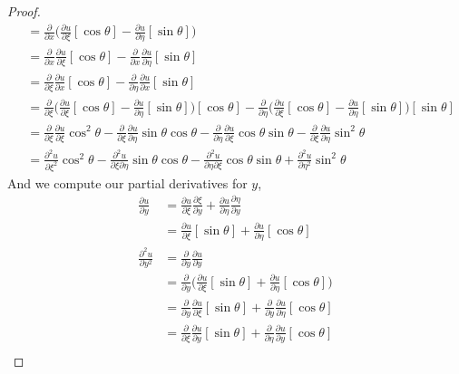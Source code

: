 \documentclass[12pt]{article}
\begin{document}
\begin{enumerate}
\begin{enumerate}
\begin{proof}
\begin{align*}
&= \frac{\partial}{\partial x}\Bigg(\frac{\partial u}{\partial \xi}[\cos\theta]- \frac{\partial u}{\partial \eta}[\sin \theta]\Bigg) \\
&= \frac{\partial}{\partial x}\frac{\partial u}{\partial \xi}[\cos\theta]-\frac{\partial}{\partial x} \frac{\partial u}{\partial \eta}[\sin \theta] \\
&= \frac{\partial}{\partial \xi}\frac{\partial u}{\partial x}[\cos\theta]-\frac{\partial}{\partial \eta} \frac{\partial u}{\partial x}[\sin \theta] \\
&= \frac{\partial}{\partial \xi}\Bigg(\frac{\partial u}{\partial \xi}[\cos\theta]- \frac{\partial u}{\partial \eta}[\sin \theta]\Bigg)[\cos\theta]-\frac{\partial}{\partial \eta} \Bigg(\frac{\partial u}{\partial \xi}[\cos\theta]- \frac{\partial u}{\partial \eta}[\sin \theta]\Bigg)[\sin \theta] \\
&= \frac{\partial}{\partial \xi}\frac{\partial u}{\partial \xi}\cos^2\theta-\frac{\partial}{\partial \xi} \frac{\partial u}{\partial \eta}\sin \theta\cos\theta-\frac{\partial}{\partial \eta}\frac{\partial u}{\partial \xi}\cos\theta\sin \theta- \frac{\partial}{\partial \xi}\frac{\partial u}{\partial \eta}\sin^2 \theta \\
&= \frac{\partial^2 u}{\partial \xi^2} \cos^2\theta - \frac{\partial^2 u}{\partial \xi\partial\eta}\sin\theta\cos\theta - \frac{\partial^2 u}{\partial \eta\partial\xi}\cos\theta\sin\theta + \frac{\partial^2 u}{\partial \eta^2}\sin^2\theta 
\end{align*}
And we compute our partial derivatives for $y$,
\begin{align*}
\frac{\partial u}{\partial y} &= \frac{\partial u}{\partial \xi}\frac{\partial \xi}{\partial y}+ \frac{\partial u}{\partial \eta}\frac{\partial \eta}{\partial y} \\
&= \frac{\partial u}{\partial \xi}[\sin\theta]+ \frac{\partial u}{\partial \eta}[\cos \theta] \\
\frac{\partial^2 u}{\partial y^2} &= \frac{\partial}{\partial y}\frac{\partial u}{\partial y} \\
&= \frac{\partial}{\partial y}\Bigg(\frac{\partial u}{\partial \xi}[\sin\theta]+ \frac{\partial u}{\partial \eta}[\cos \theta]\Bigg) \\
&= \frac{\partial}{\partial y}\frac{\partial u}{\partial \xi}[\sin\theta]+\frac{\partial}{\partial y} \frac{\partial u}{\partial \eta}[\cos \theta] \\
&= \frac{\partial}{\partial \xi}\frac{\partial u}{\partial y}[\sin\theta]+\frac{\partial}{\partial \eta} \frac{\partial u}{\partial y}[\cos \theta] \\

\end{align*}
\end{proof}
\end{enumerate}
\end{enumerate}
\end{document}
